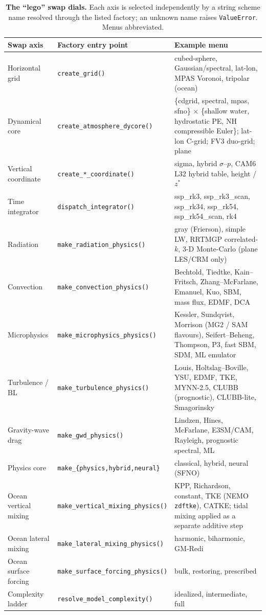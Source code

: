 \documentclass[11pt,a4paper]{article}
\begin{document}
\begin{table}[t]
\centering
\footnotesize
\caption{\textbf{The ``lego'' swap dials.} Each axis is selected independently by
a string scheme name resolved through the listed factory; an unknown name raises
\texttt{ValueError}. Menus abbreviated.}
\label{tab:dials}
\begin{tabular}{@{}p{2.9cm}p{4.4cm}p{7.2cm}@{}}
\toprule
\textbf{Swap axis} & \textbf{Factory entry point} & \textbf{Example menu} \\
\midrule
Horizontal grid & \texttt{create\_grid()} & cubed-sphere, Gaussian/spectral, lat-lon, MPAS Voronoi, tripolar (ocean) \\
Dynamical core & \texttt{create\_atmosphere\_dycore()} & \{cdgrid, spectral, mpas, sfno\} $\times$ \{shallow water, hydrostatic PE, NH compressible Euler\}; lat-lon C-grid; FV3 duo-grid; plane \\
Vertical coordinate & \texttt{create\_*\_coordinate()} & sigma, hybrid $\sigma$--$p$, CAM6 L32 hybrid table, height / $z^*$ \\
Time integrator & \texttt{dispatch\_integrator()} & ssp\_rk3, ssp\_rk3\_scan, ssp\_rk34, ssp\_rk54, ssp\_rk54\_scan, rk4 \\
Radiation & \texttt{make\_radiation\_physics()} & gray (Frierson), simple LW, RRTMGP correlated-$k$, 3-D Monte-Carlo (plane LES/CRM only) \\
Convection & \texttt{make\_convection\_physics()} & Bechtold, Tiedtke, Kain--Fritsch, Zhang--McFarlane, Emanuel, Kuo, SBM, mass flux, EDMF, DCA \\
Microphysics & \texttt{make\_microphysics\_physics()} & Kessler, Sundqvist, Morrison (MG2 / SAM flavours), Seifert--Beheng, Thompson, P3, fast SBM, SDM, ML emulator \\
Turbulence / BL & \texttt{make\_turbulence\_physics()} & Louis, Holtslag--Boville, YSU, EDMF, TKE, MYNN-2.5, CLUBB (prognostic), CLUBB-lite, Smagorinsky \\
Gravity-wave drag & \texttt{make\_gwd\_physics()} & Lindzen, Hines, McFarlane, E3SM/CAM, Rayleigh, prognostic spectral, ML \\
Physics core & \texttt{make\_\{physics,hybrid,neural\}} & classical, hybrid, neural (SFNO) \\
Ocean vertical mixing & \texttt{make\_vertical\_mixing\_physics()} & KPP, Richardson, constant, TKE (NEMO \texttt{zdftke}), CATKE; tidal mixing applied as a separate additive step \\
Ocean lateral mixing & \texttt{make\_lateral\_mixing\_physics()} & harmonic, biharmonic, GM-Redi \\
Ocean surface forcing & \texttt{make\_surface\_forcing\_physics()} & bulk, restoring, prescribed \\
Complexity ladder & \texttt{resolve\_model\_complexity()} & idealized, intermediate, full \\
\bottomrule
\end{tabular}
\end{table}
\end{document}
